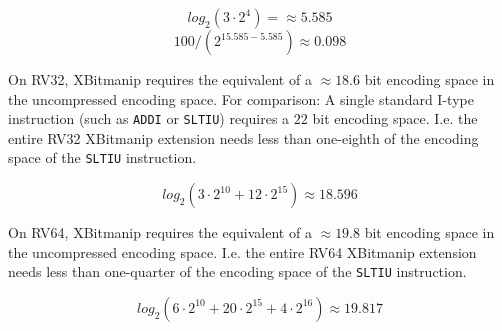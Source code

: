 $$ log_2(3 \cdot 2^4) = \approx 5.585 $$
$$ 100 / (2^{15.585-5.585}) \approx 0.098 $$

On RV32, XBitmanip requires the equivalent of a $\approx 18.6$ bit encoding space in
the uncompressed encoding space. For comparison: A single standard I-type
instruction (such as \texttt{ADDI} or \texttt{SLTIU}) requires a $22$ bit
encoding space. I.e. the entire RV32 XBitmanip extension needs less than
one-eighth of the encoding space of the \texttt{SLTIU} instruction.

$$ log_2(3\cdot2^{10} + 12\cdot2^{15}) \approx 18.596 $$

On RV64, XBitmanip requires the equivalent of a $\approx 19.8$ bit encoding
space in the uncompressed encoding space. I.e. the entire RV64 XBitmanip
extension needs less than one-quarter of the encoding space of the
\texttt{SLTIU} instruction.

$$ log_2(6\cdot2^{10} + 20\cdot2^{15} + 4\cdot2^{16}) \approx 19.817 $$

